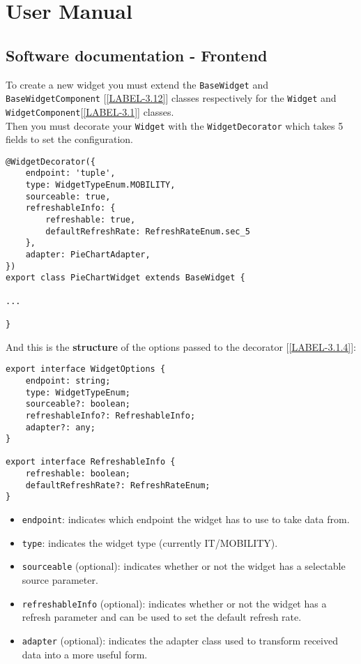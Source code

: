 \chapter{User Manual}
\section{Software documentation - Frontend}
To create a new widget you must extend the \verb|BaseWidget| and \verb|BaseWidgetComponent| [\ref{LABEL-3.12}] classes respectively for the \verb|Widget| and \verb|WidgetComponent|[\ref{LABEL-3.1}] classes.\\
Then you must decorate your \verb|Widget| with the \verb|WidgetDecorator| which takes 5 fields to set the configuration.
\begin{lstlisting}[caption={PieChartWidget example}, style=javaScriptCode]
@WidgetDecorator({
    endpoint: 'tuple', 
    type: WidgetTypeEnum.MOBILITY,
    sourceable: true,
    refreshableInfo: {
        refreshable: true,
        defaultRefreshRate: RefreshRateEnum.sec_5
    },
    adapter: PieChartAdapter,
})
export class PieChartWidget extends BaseWidget {

...

}
\end{lstlisting}
And this is the \textbf{structure} of the options passed to the decorator [\ref{LABEL-3.1.4}]:
\begin{lstlisting}[caption={Structure of WidgetOptions}, style=javaScriptCode]
export interface WidgetOptions {
    endpoint: string;
    type: WidgetTypeEnum;
    sourceable?: boolean;
    refreshableInfo?: RefreshableInfo; 
    adapter?: any;
}

export interface RefreshableInfo {
    refreshable: boolean;
    defaultRefreshRate?: RefreshRateEnum;
}
\end{lstlisting}
\begin{itemize}
    \item \verb|endpoint|: indicates which endpoint the widget has to use to take data from.
    \item \verb|type|: indicates the widget type (currently IT/MOBILITY).
    \item \verb|sourceable| (optional): indicates whether or not the widget has a selectable source parameter.
    \item \verb|refreshableInfo| (optional): indicates whether or not the widget has a refresh parameter and can be used to set the default refresh rate.
    \item \verb|adapter| (optional): indicates the adapter class used to transform received data into a more useful form.
\end{itemize}
